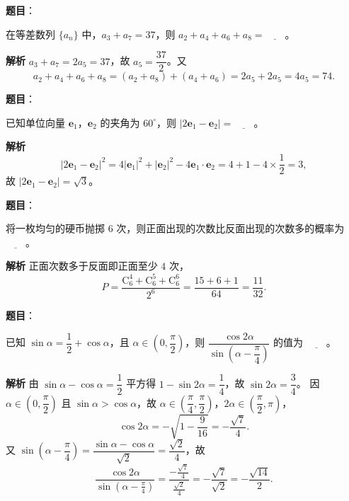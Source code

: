 \begin{answer}

\textbf{题目}：

在等差数列 $\{a_n\}$ 中，$a_3+a_7=37$，则 $a_2+a_4+a_6+a_8=\underline{\qquad}$。

\textbf{解析}
$a_3+a_7=2a_5=37$，故 $a_5=\dfrac{37}2$。又
\nopagebreak[4]
\[a_2+a_4+a_6+a_8=(a_2+a_8)+(a_4+a_6)=2a_5+2a_5=4a_5=74.\]


\end{answer}
\begin{answer}

\textbf{题目}：

已知单位向量 $\boldsymbol e_1$，$\boldsymbol e_2$ 的夹角为 $60^\circ$，则 $|2\boldsymbol e_1-\boldsymbol e_2|=\underline{\qquad}$。

\textbf{解析}
\nopagebreak[4]
\[|2\boldsymbol e_1-\boldsymbol e_2|^2=4|\boldsymbol e_1|^2+|\boldsymbol e_2|^2-4\boldsymbol e_1\cdot\boldsymbol e_2=4+1-4\times\frac12=3,\]
故 $|2\boldsymbol e_1-\boldsymbol e_2|=\sqrt3$。


\end{answer}
\begin{answer}

\textbf{题目}：

将一枚均匀的硬币抛掷 $6$ 次，则正面出现的次数比反面出现的次数多的概率为 $\underline{\qquad}$。

\textbf{解析}
正面次数多于反面即正面至少 $4$ 次，
\nopagebreak[4]
\[P=\frac{\mathrm C_6^4+\mathrm C_6^5+\mathrm C_6^6}{2^6}=\frac{15+6+1}{64}=\frac{11}{32}.\]


\end{answer}
\begin{answer}

\textbf{题目}：

已知 $\sin\alpha=\dfrac12+\cos\alpha$，且 $\alpha\in\left(0,\dfrac\pi2\right)$，则 $\dfrac{\cos2\alpha}{\sin\left(\alpha-\dfrac\pi4\right)}$ 的值为 $\underline{\qquad}$。

\textbf{解析}
由 $\sin\alpha-\cos\alpha=\dfrac12$ 平方得 $1-\sin2\alpha=\dfrac14$，故 $\sin2\alpha=\dfrac34$。
因 $\alpha\in\left(0,\dfrac\pi2\right)$ 且 $\sin\alpha>\cos\alpha$，故 $\alpha\in\left(\dfrac\pi4,\dfrac\pi2\right)$，$2\alpha\in\left(\dfrac\pi2,\pi\right)$，
\nopagebreak[4]
\[\cos2\alpha=-\sqrt{1-\frac9{16}}=-\frac{\sqrt7}4.\]
又 $\sin\left(\alpha-\dfrac\pi4\right)=\dfrac{\sin\alpha-\cos\alpha}{\sqrt2}=\dfrac{\sqrt2}4$，故
\nopagebreak[4]
\[\frac{\cos2\alpha}{\sin\left(\alpha-\frac\pi4\right)}=\frac{-\frac{\sqrt7}4}{\frac{\sqrt2}4}=-\frac{\sqrt7}{\sqrt2}=-\frac{\sqrt{14}}2.\]


\end{answer}
